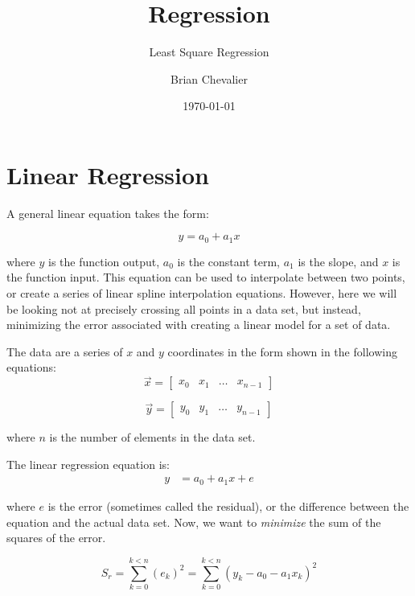 \documentclass{../../KDHnotes}
\title{Regression}
\subtitle{Least Square Regression}
\author{Brian Chevalier}
\date{\today}
\begin{document}
\maketitle

\section{Linear Regression}

A general linear equation takes the form:

\begin{equation}
	y = a_0 + a_1x
\end{equation}

where $y$ is the function output, $a_0$ is the constant term, $a_1$ is the slope, and $x$ is the function input. This equation can be used to interpolate between two points, or create a series of linear spline interpolation equations. However, here we will be looking not at precisely crossing all points in a data set, but instead, minimizing the error associated with creating a linear model for a set of data.

The data are a series of $x$ and $y$ coordinates in the form shown in the following equations:
\begin{equation}
	\vec{x} = \begin{bmatrix}
	x_0 & x_1 & \dots & x_{n-1}
	\end{bmatrix}
\end{equation}

\begin{equation}
	\vec{y}=
	\begin{bmatrix}
	y_0 & y_1 & \dots & y_{n-1}
	\end{bmatrix}
\end{equation}

where $n$ is the number of elements in the data set.

The linear regression equation is:
\begin{align}
	y &= a_0 + a_1 x + e
\end{align}

where $e$ is the error (sometimes called the residual), or the difference between the equation and the actual data set. Now, we want to \textit{minimize} the sum of the squares of the error.

\begin{equation}
S_r = \sum_{k=0}^{k<n} (e_k)^2 = \sum_{k=0}^{k<n} (y_k - a_0 - a_1 x_k)^2
\end{equation}
\end{document}
